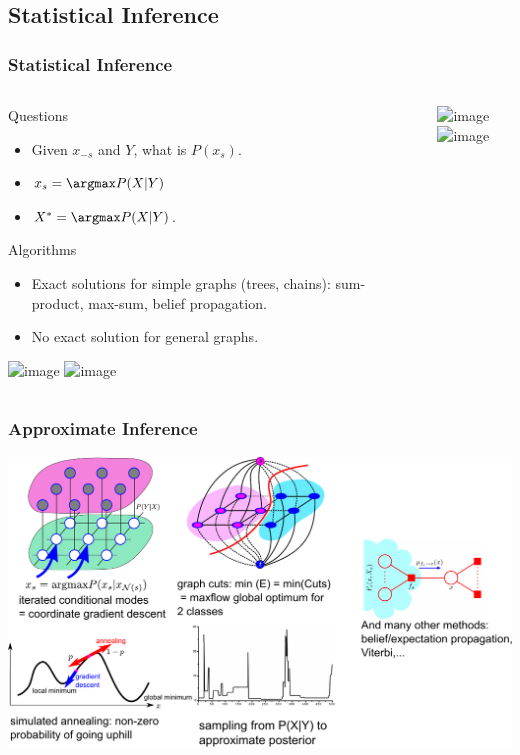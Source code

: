 \documentclass[sansserif, 10pt]{beamer}
\begin{document}
\subsection{Statistical Inference}
\begin{frame}
  \frametitle{Statistical Inference}

  \begin{columns}
    \begin{column}{0.65\textwidth}
      \begin{block}{Questions}
        \begin{itemize}
        \item Given $x_{-s}$ and $Y$, what is $P(x_s)$. 
        \item $x_s = \argmax P(X|Y)$
        \item \alert{$X^* = \argmax P(X | Y)$.}
        \end{itemize}
      \end{block}

      \begin{block}{Algorithms}
        \begin{itemize}
        \item Exact solutions for simple graphs (trees, chains): sum-product,
          max-sum, belief propagation.
        \item No exact solution for general graphs. 
        \end{itemize}
      \end{block}
      \includegraphics<1>[width=0.8\textwidth]{sfig/chaintree}
      \includegraphics<2>[width=0.8\textwidth]{sfig/chaintree_check}
    \end{column}

    \begin{column}{0.35\textwidth}
      \includegraphics<1>[height=0.9\textheight]{sfig/generalgraphs}
      \includegraphics<2>[height=0.9\textheight]{sfig/generalgraphs_check}
    \end{column}

    \end{columns}
\end{frame}

\begin{frame}
  \frametitle{Approximate Inference}
  \includegraphics[width=\textwidth]{sfig/appinference}
\end{frame}
\end{document}
